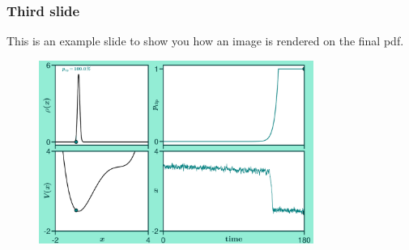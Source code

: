 \documentclass[./main.tex]{subfiles}
\begin{document}
\begin{frame}[label=slide03]
        \frametitle{Third slide}

        This is an example slide to show you how an image is rendered on the final pdf.
        \begin{figure}
                \centering
                \includegraphics[keepaspectratio, width=0.8\textwidth]{./figures/figure.png}
        \end{figure}
 
\end{frame}
\end{document}
